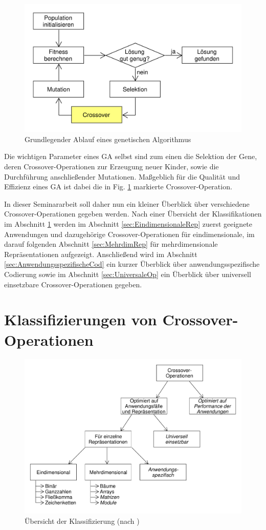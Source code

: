 \documentclass{llncs}
\begin{document}
	\begin{figure}
		\centering
		\includegraphics[width=.8\columnwidth]{./Figures/GA-Prinzip.pdf}
		\caption{Grundlegender Ablauf eines genetischen Algorithmus}
		\label{fig:abb1}
	\end{figure}	

	Die wichtigen Parameter eines GA selbst sind zum einen die Selektion der Gene, deren Crossover-Operationen zur Erzeugung neuer Kinder, sowie die Durch\-füh\-rung anschließender Mutationen. Maßgeblich für die Qualität und Effizienz eines GA ist dabei die in Fig. \ref{fig:abb1} markierte Crossover-Operation.
	
	In dieser Seminararbeit soll daher nun ein kleiner Überblick über verschiedene Crossover-Operationen gegeben werden. Nach einer Übersicht der Klassifikationen im Abschnitt \ref{sec:KlassifizierungCrossover} werden im Abschnitt \ref{sec:EindimensionaleRep} zuerst geeignete Anwendungen und dazugehörige Crossover-Operationen für eindimensionale, im darauf folgenden Abschnitt \ref{sec:MehrdimRep} für mehrdimensionale Repräsentationen aufgezeigt. Anschließend wird im Abschnitt \ref{sec:AnwendungsspezifischeCod} ein kurzer Überblick über anwendungsspezifische Codierung sowie im Abschnitt \ref{sec:UniversaleOp} ein Überblick über universell einsetzbare Crossover-Operationen gegeben.

\section{Klassifizierungen von Crossover-Operationen}
\label{sec:KlassifizierungCrossover}

	\begin{figure}
		\centering
		\includegraphics[width=.8\columnwidth]{./Figures/Crossover-Klassifizierung.pdf}
		\caption{Übersicht der Klassifizierung (nach \cite{Survey})}
		\label{fig:abb2}
	\end{figure}
\end{document}
